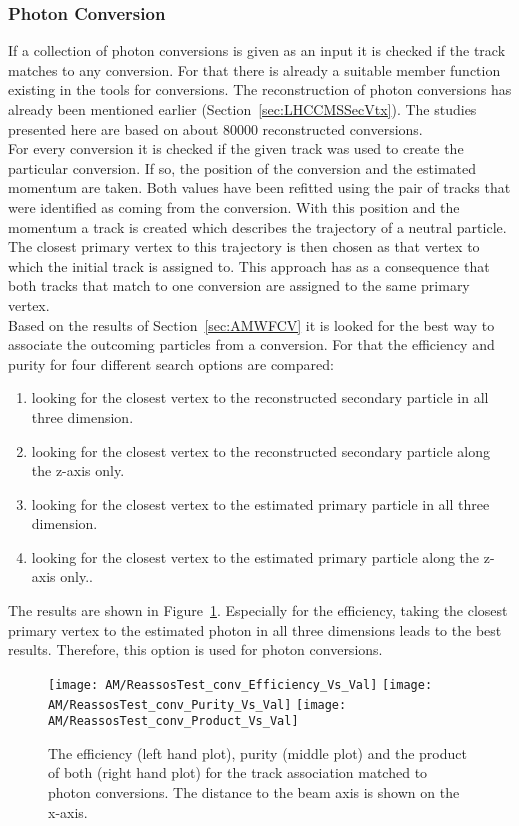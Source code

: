 \subsubsection{Photon Conversion \label{sec:AMWFSVpc}}
If a collection of photon conversions is given as an input it is checked if the track matches to any conversion. For that there is already a suitable member function existing in the tools for conversions. The reconstruction of photon conversions has already been mentioned earlier (Section~\ref{sec:LHCCMSSecVtx}). The studies presented here are based on about 80000 reconstructed conversions. \\
For every conversion it is checked if the given track was used to create the particular conversion. If so, the position of the conversion and the estimated momentum are taken. Both values have been refitted using the pair of tracks that were identified as coming from the conversion. With this position and the momentum a track is created which describes the trajectory of a neutral particle. The closest primary vertex to this trajectory is then chosen as that vertex to which the initial track is assigned to.  This approach has as a consequence that both tracks that match to one conversion are assigned to the same primary vertex. \\
Based on the results of Section~\ref{sec:AMWFCV} it is looked for the best way to associate the outcoming particles from a conversion. For that the efficiency and purity for four different search options are compared: 
\begin{enumerate}
\item looking for the closest vertex to the reconstructed secondary particle in all three dimension.
\item looking for the closest vertex to the reconstructed secondary particle along the z-axis only.
\item looking for the closest vertex to the estimated primary particle in all three dimension.
\item looking for the closest vertex to the estimated primary particle along the z-axis only..
\end{enumerate}
The results are shown in Figure~\ref{plot:AMWFSVpcEffAndPurSO}. Especially for the efficiency, taking the closest primary vertex to the estimated photon in all three dimensions leads to the best results. Therefore, this option is used for photon conversions.

\begin{figure}[!ht]
  \centering
  \texttt{[image: AM/ReassosTest\_conv\_Efficiency\_Vs\_Val]}
  \texttt{[image: AM/ReassosTest\_conv\_Purity\_Vs\_Val]}
  \texttt{[image: AM/ReassosTest\_conv\_Product\_Vs\_Val]}
  \caption[Efficiency, purity and their product of the association with photon conversions for different search options as a function of distance to the beam axis]{The efficiency (left hand plot), purity (middle plot) and the product of both (right hand plot) for the track association matched to photon conversions. The distance to the beam axis is shown on the x-axis.\label{plot:AMWFSVpcEffAndPurSO}}
\end{figure}

